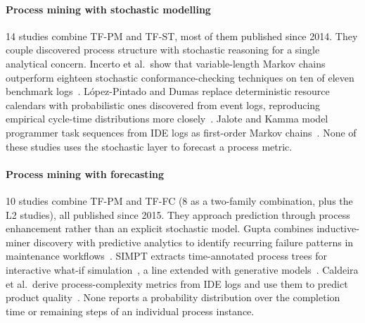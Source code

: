 \documentclass[preprint,12pt,authoryear=false]{elsarticle}
\newcommand{\PM}{TF-PM}
\newcommand{\ST}{TF-ST}
\newcommand{\FC}{TF-FC}
\begin{document}
\paragraph{Process mining with stochastic modelling}
14 studies combine \PM{} and \ST{}, most of them published since 2014. They couple discovered process structure with stochastic reasoning for a single analytical concern. Incerto et al.\ show that variable-length Markov chains outperform eighteen stochastic conformance-checking techniques on ten of eleven benchmark logs~\cite{incerto2025}. López-Pintado and Dumas replace deterministic resource calendars with probabilistic ones discovered from event logs, reproducing empirical cycle-time distributions more closely~\cite{lopezpintado2023}. Jalote and Kamma model programmer task sequences from IDE logs as first-order Markov chains~\cite{jalote2021}. None of these studies uses the stochastic layer to forecast a process metric.

\paragraph{Process mining with forecasting}
10 studies combine \PM{} and \FC{} (8 as a two-family combination, plus the L2 studies), all published since 2015. They approach prediction through process enhancement rather than an explicit stochastic model. Gupta combines inductive-miner discovery with predictive analytics to identify recurring failure patterns in maintenance workflows~\cite{gupta2017}. SIMPT extracts time-annotated process trees for interactive what-if simulation~\cite{pourbafrani2021}, a line extended with generative models~\cite{buliga2025}. Caldeira et al.\ derive process-complexity metrics from IDE logs and use them to predict product quality~\cite{caldeira2022}. None reports a probability distribution over the completion time or remaining steps of an individual process instance.
\end{document}
